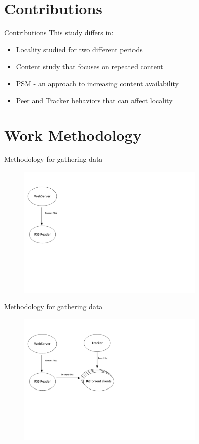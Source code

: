 \documentclass{beamer}
\begin{document}
\section{Contributions}

\begin{frame}{Contributions}
This study differs in:
\begin{itemize}
\addtolength{\itemsep}{1\baselineskip}
\item
    Locality studied for two different periods
\item
   Content study that focuses on repeated content
\item
   PSM - an approach to increasing content availability 
\item
   Peer and Tracker behaviors that can affect locality
\end{itemize}
\end{frame}


\section{Work Methodology}

\begin{frame}{Methodology for gathering data}

\begin{figure}
\includegraphics[height=2.5in]{figures/ArqSimplesV2_1}
\label{fig:3} 
\end{figure}

\end{frame}

\begin{frame}{Methodology for gathering data}

\begin{figure}
\includegraphics[height=2.5in]{figures/ArqSimplesV2_2}
\label{fig:4} 
\end{figure}

\end{frame}
\end{document}
